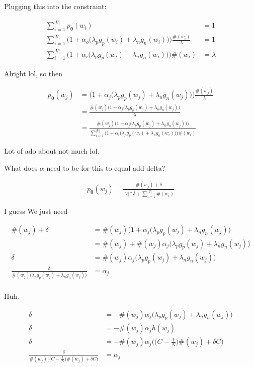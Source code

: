 \documentclass{article}
\newcommand{\vtheta}{\boldsymbol{\theta}}
\newcommand{\model}{p_{\vtheta}}
\begin{document}
		Plugging this into the constraint:
		
		\begin{align}
		 	\sum^{|V|}_{i=1} \model(w_i) &= 1\\
		 	\sum^{|V|}_{i=1} \bigg(1 +\alpha_o\bigg(\lambda_p g_p(w_i) +\lambda_n g_n(w_i)\bigg)\bigg)\frac{\#(w_i)}{\lambda} &= 1\\
		 	\sum^{|V|}_{i=1} \bigg(1 +\alpha_i\bigg(\lambda_p g_p(w_i) +\lambda_n g_n(w_i)\bigg)\bigg)\#(w_i) &= \lambda
		\end{align}
		
		Alright lol, so then
		
		\begin{align}
			\model(w_j)  &= \bigg(1 +\alpha_j\bigg(\lambda_p g_p(w_j) +\lambda_n g_n(w_j)\bigg)\bigg)\frac{\#(w_j)}{\lambda}\\
			&= \frac{\#(w_j)\bigg(1 +\alpha_j\bigg(\lambda_p g_p(w_j) +\lambda_n g_n(w_j)\bigg)}{\lambda}\\
			&= \frac{\#(w_j)\bigg(1 +\alpha_j\bigg(\lambda_p g_p(w_j) +\lambda_n g_n(w_j)\bigg)\bigg)}{\sum^{|V|}_{i=1} \bigg(1 +\alpha_i\bigg(\lambda_p g_p(w_i) +\lambda_n g_n(w_i)\bigg)\bigg)\#(w_i)}
		\end{align}
		
		Lot of ado about not much lol.
		
		What does $\alpha$ need to be for this to equal add-delta?
		
		\begin{align}
			\model(w_j) = \frac{\#(w_j) + \delta}{|V|*\delta + \sum^{|V|}_{i=1} \#(w_i)}
		\end{align}
		
		I guess We just need 
		
		\begin{align}
			\#(w_j) + \delta &= \#(w_j)\bigg(1 +\alpha_j\bigg(\lambda_p g_p(w_j) +\lambda_n g_n(w_j)\bigg)\\
			&= \#(w_j) +\#(w_j)\alpha_j\bigg(\lambda_p g_p(w_j) +\lambda_n g_n(w_j)\bigg)\\
			 \delta &= \#(w_j)\alpha_j\bigg(\lambda_p g_p(w_j) +\lambda_n g_n(w_j)\bigg)\\
			 \frac{\delta}{\#(w_j)\big(\lambda_p g_p(w_j) +\lambda_n g_n(w_j)\big)} &= \alpha_j\\
		\end{align}
		
		Huh.
		
		\begin{align}
			\delta &=-\#(w_j)\alpha_j\bigg(\lambda_p g_p(w_j) +\lambda_n g_n(w_j)\bigg)\\
			\delta &= -\#(w_j)\alpha_j h(w_j)\\
			\delta &= -\#(w_j)\alpha_j \bigg(\bigg(C - \frac{1}{N}\bigg)\#(w_j) + \delta C\bigg)\\
			\frac{\delta}{\#(w_j)\bigg(\bigg(C - \frac{1}{N}\bigg)\#(w_j) + \delta C\bigg)} &= \alpha_j \\	
		\end{align}
		
\end{document}
